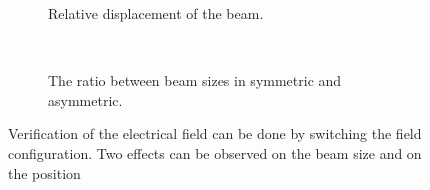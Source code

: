 \begin{figure}[!ht]
  \begin{subfigure}[t]{0.5\textwidth}
    
    \caption{Relative displacement of the beam.}
    \label{chap4:COMSOL_check_a}
  \end{subfigure}
  ~
  \begin{subfigure}[t]{0.5\textwidth}
    
    \caption{The ratio between beam sizes in symmetric and asymmetric.}
    \label{chap4:COMSOL_check_b}
  \end{subfigure}
  \caption[Verification of the electrical field can be done by switching the field configuration]{Verification of the electrical field can be done by switching the field configuration. Two effects can be observed on the beam size and on the position}
  \label{chap4:COMSOL_check}
\end{figure}

